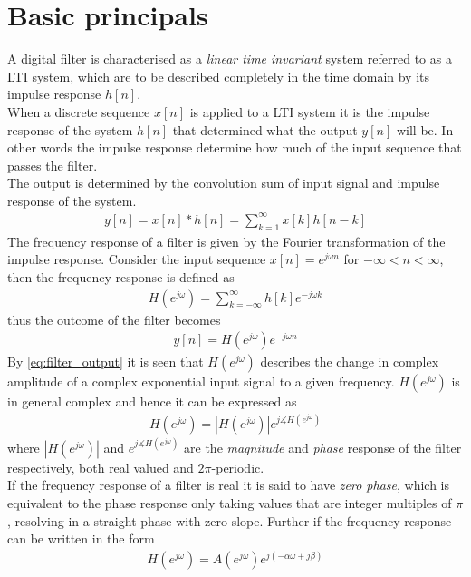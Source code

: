 \section{Basic principals}

A digital filter is characterised as a \textit{linear time invariant} system referred to as a LTI system, which are to be described completely in the time domain by its impulse response $h[n]$. \\
When a discrete sequence $x[n]$ is applied to a LTI system it is the impulse response of the system $h[n]$ that determined what the output $y[n]$ will be. In other words the impulse response determine how much of the input sequence that passes the filter. \\ 
The output is determined by the convolution sum of input signal and impulse response of the system.
\begin{align}
y[n] = x[n]*h[n] = \sum_{k=1}^{\infty} x[k]h[n-k]
\end{align}    
The frequency response of a filter is given by the Fourier transformation of the impulse response. Consider the input sequence $x[n]=e^{j\omega n}$ for $-\infty < n <\infty$, then the frequency response is defined as
\begin{align}
H(e^{j\omega})=\sum_{k=-\infty}^{\infty}h[k]e^{-j\omega k}
\end{align}
thus the outcome of the filter becomes 
\begin{align}
y[n]=H(e^{j\omega})e^{-j\omega n} \label{eq:filter_output}
\end{align} 
By \eqref{eq:filter_output} it is seen that $H(e^{j\omega})$ describes the change in complex amplitude of a complex exponential input signal to a given frequency. $H(e^{j\omega})$ is in general complex and hence it can be expressed as
\begin{align}
H(e^{j\omega})=|H(e^{j\omega})|e^{j\measuredangle H(e^{j\omega})}
\end{align}  
where $|H(e^{j\omega})|$ and $e^{j\measuredangle H(e^{j\omega})}$ are the \textit{magnitude} and \textit{phase} response of the filter respectively, both real valued and $2\pi$-periodic.\\ 
If the frequency response of a filter is real it is said to have \textit{zero phase}, which is equivalent to the phase response only taking values that are integer multiples of $\pi$, resolving in a straight phase with zero slope.   Further if the frequency response can be written in the form 
\begin{align}
H(e^{j\omega})=A(e^{j\omega})e^{j(-\alpha\omega + j\beta)} 
\end{align}
